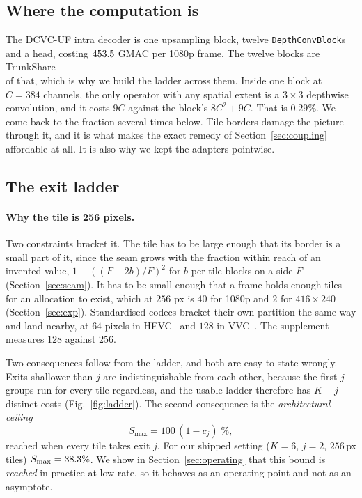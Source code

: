 \documentclass[10pt,twocolumn,letterpaper]{article}
\begin{document}
\subsection{Where the computation is}

The DCVC-UF intra decoder is one upsampling block, twelve \texttt{DepthConvBlock}s
and a head, costing $453.5$ GMAC per 1080p frame. The twelve blocks are \\TrunkShare\\%
of that, which is why we build the ladder across them. Inside one block at
$C{=}384$ channels, the only operator with any spatial extent is a $3\times3$
depthwise convolution, and it costs $9C$ against the block's $8C^2 + 9C$. That is
$\mathbf{0.29\%}$. We come back to the fraction several times below. Tile
borders damage the picture through it, and it is what makes the exact remedy of
Section~\ref{sec:coupling} affordable at all. It is also why we kept the adapters
pointwise.

\subsection{The exit ladder}

\paragraph{Why the tile is 256 pixels.} Two constraints bracket it. The tile has
to be large enough that its border is a small part of it, since the seam grows
with the fraction within reach of an invented value, $1-((F-2b)/F)^2$ for $b$
per-tile blocks on a side $F$ (Section~\ref{sec:seam}). It has to be small
enough that a frame holds enough tiles for an allocation to exist, which at
$256$ px is $40$ for 1080p and $2$ for $416{\times}240$ (Section~\ref{sec:exp}). Standardised
codecs bracket their own partition the same way and land nearby, at $64$ pixels
in HEVC~\cite{hevc} and $128$ in VVC~\cite{vvc}. The supplement measures $128$
against $256$.


Two consequences follow from the ladder, and both are easy to state wrongly.
Exits shallower than $j$ are indistinguishable from each other, because the first
$j$ groups run for every tile regardless, and the usable ladder therefore has
$K-j$ distinct costs (Fig.~\ref{fig:ladder}). The second consequence is the \emph{architectural ceiling}
\begin{equation}
S_{\max} = 100\,(1 - c_j)\;\%,
\label{eq:ceiling}
\end{equation}
reached when every tile takes exit $j$. For our shipped setting ($K{=}6$,
$j{=}2$, $256$\,px tiles) $S_{\max} = 38.3\%$. We show in
Section~\ref{sec:operating} that this bound is \emph{reached} in practice at low
rate, so it behaves as an operating point and not as an asymptote.
\end{document}
